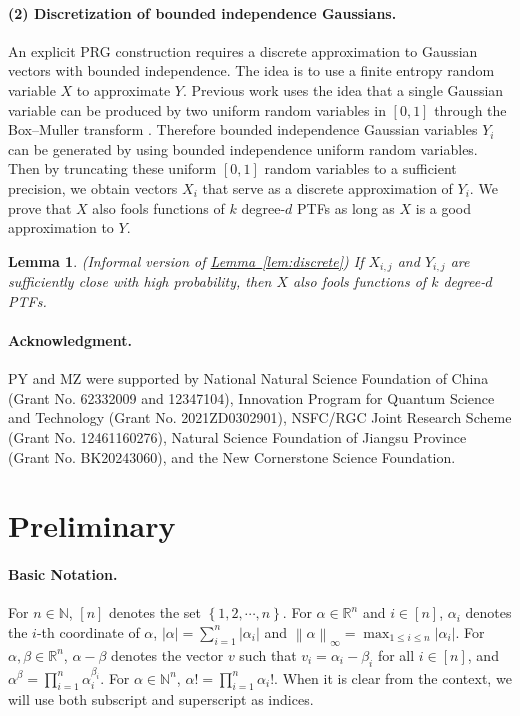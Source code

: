 \documentclass[12pt]{article}
\newtheorem{lemma}[theorem]{Lemma}
\newcommand{\lem}[1]{\hyperref[lem:#1]{Lemma~\ref*{lem:#1}}}
\newcommand{\N}{\mathbb{N}}  \newcommand{\R}{\mathbb{R}} \newcommand{\C}{\mathbb{C}} \newcommand{\U}{\mathbb{U}} \renewcommand{\d}{\mathrm{d}} \DeclareMathOperator*{\E}{\mathbb{E}}  \newcommand{\so}{\mathrm{SO}} \newcommand{\s}{\mathrm{S}} \newcommand{\su}{\mathrm{SU}} \renewcommand{\i}{\mathrm{i}} \newcommand{\A}{\mathcal{A}}  \newcommand{\B}{\mathcal{B}} \newcommand{\CC}{\mathcal{C}} \newcommand{\D}{\mathcal{D}} \newcommand{\F}{\mathcal{F}} \renewcommand{\H}{\mathcal{H}} \newcommand{\K}{\mathcal{K}} \newcommand{\NN}{\mathcal{N}} \newcommand{\V}{\mathcal{V}} \newcommand{\X}{\mathcal{X}} \newcommand{\Y}{\mathcal{Y}} \renewcommand{\S}{\mathcal{S}} \newcommand{\SR}{\mathcal{S}_{\R}} \newcommand{\SC}{\mathcal{S}_{\C}} \newcommand{\EE}{\mathcal{E}}  \newcommand{\PP}{\mathcal{P}} \newcommand{\KK}{\widetilde{K}} \newcommand{\LL}{\widetilde{L}} \newcommand{\W}{\widehat{W}} \newcommand{\f}{\hat{f}} \newcommand{\g}{\hat{g}} \newcommand{\h}{\hat{h}} \newcommand{\bit}[1]{\{0,1\}^{#1}} \newcommand{\wrt}{w.r.t.~} \newcommand{\us}{\overset{\$}{\leftarrow}} \newcommand{\set}[1]{\left\{#1\right\}} \newcommand{\lhs}{\mathrm{LHS}} \newcommand{\expec}[1]{\E\!\Br{#1}} \newcommand{\expect}[2]{\E_{\substack{#1}}\!\Br{#2}} \newcommand{\prob}[2]{\underset{#1}{\mathrm{Pr}}\!\Br{#2}} \newcommand{\cf}{\widetilde{f}} \newcommand{\cg}{\widetilde{g}} \newcommand{\ch}{\widetilde{h}} \newcommand{\ck}{\widetilde{K}} \newcommand{\rep}[2]{\br{#1}_{#2}} \newcommand{\AND}[1]{\mathrm{AND}\!\br{#1}}
\newcommand{\br}[1]{\left(#1\right)} \newcommand{\Br}[1]{\left[#1\right]} \newcommand{\st}[1]{\left\{#1\right\}} \newcommand{\tr}[1]{\mathrm{Tr}\!\Br{#1}} \newcommand{\abs}[1]{\left|#1 \right|} \newcommand{\norm}[1]{\left\lVert #1 \right\rVert} \newcommand{\agl}[2]{\theta^{\br{#1}}_{#2}} \newcommand{\aglp}[2]{{\theta'}^{\br{#1}}_{#2}} \newcommand{\lint}[1]{\left\lfloor#1\right\rfloor} \newcommand{\poly}[1]{\mathrm{poly}\!\br{#1}} \newcommand{\negl}[1]{\mathrm{negl}\!\br{#1}} \newcommand{\de}[1]{\mathrm{d}#1} \newcommand{\val}[1]{\mathrm{val}\!\br{#1}} \newcommand{\vall}[1]{\mathrm{val}\br{#1}} \newcommand{\nd}[1]{\mathcal{N}\!\br{#1}} \newcommand{\ketbratwo}[2]{\ket{#1} \hspace{-0.4em}\bra{#2}} \newcommand{\ketbra}[1]{\ketbratwo{#1}{#1}} \newcommand{\id}{\ensuremath{\mathds{1}}} \newcommand{\ogroup}[1]{\mathrm{O}\!\br{#1}} \newcommand{\ugroup}[1]{\mathrm{U}\!\br{#1}} \newcommand{\td}{\mathrm{TD}} \newcommand{\tv}[1]{\norm{#1}_{\mathrm{TV}}} \newcommand {\defeq} {\ensuremath{ \stackrel{\mathrm{def}}{=} }} \newcommand{\vdim}{\ensuremath{N}} \newcommand{\dimin}{\ensuremath{n}} \newcommand{\dimout}{\ensuremath{m}} \newcommand{\ncopy}{\ell} \newcommand{\hspacein}{\H_\mathrm{in}} \newcommand{\hspaceout}{\H_\mathrm{out}} \newcommand{\Sin}{\S(\hspacein)} \newcommand{\Sout}{\S(\hspaceout)} \newcommand{\haar}{\ensuremath{\mu}} \newcommand{\tensorhaar}{\ensuremath{\eta}} \newcommand{\tensorsrss}{\ensuremath{\nu}} \newcommand{\qadvice}{\ensuremath{\rho}} \newcommand{\tp}{\otimes} \newcommand{\wone}[2]{W_1\!\br{#1,#2}}
\begin{document}
\paragraph{(2) Discretization of bounded independence Gaussians.}
An explicit PRG construction requires a discrete approximation to Gaussian vectors with bounded independence.
The idea is to use a finite entropy random variable $X$ to approximate $Y$.
Previous work \cite{Kan11b} uses the idea that a single Gaussian variable can be produced by two uniform random variables in $[0,1]$ through the Box–Muller transform \cite{Bm58}.
Therefore bounded independence Gaussian variables $Y_i$ can be generated by using bounded independence uniform random variables.
Then by truncating these uniform $[0,1]$ random variables to a sufficient precision, we obtain vectors $X_i$ that serve as a discrete approximation of $Y_i$.
We prove that $X$ also fools functions of $k$ degree-$d$ PTFs as long as $X$ is a good approximation to $Y$.
\begin{lemma}(Informal version of \lem{discrete})
	If $X_{i,j}$ and $Y_{i,j}$ are sufficiently close with high probability, then $X$ also fools functions of $k$ degree-$d$ PTFs.
\end{lemma}
















 

\paragraph{Acknowledgment.} PY and MZ were supported by
National Natural Science Foundation of China (Grant No. 62332009 and 12347104),
Innovation Program for Quantum Science and Technology (Grant No. 2021ZD0302901),
NSFC/RGC Joint Research Scheme (Grant No. 12461160276),
Natural Science Foundation of Jiangsu Province (Grant No. BK20243060),
and the New Cornerstone Science Foundation.

\section{Preliminary}
\label{sec:prelim}
\paragraph{Basic Notation.}
For $n\in \N$, $[n]$ denotes the set $\st{1,2,\cdots,n}$.
For $\alpha\in \R^n$ and $i\in[n]$, $\alpha_i$ denotes the $i$-th coordinate of $\alpha$, $\abs{\alpha} = \sum_{i=1}^n \abs{\alpha_i}$ and $\norm{\alpha}_{\infty} = \max_{1\leq i\leq n} \abs{\alpha_i}$.
For $\alpha, \beta\in \R^n$, $\alpha-\beta$ denotes the vector $v$ such that $v_i = \alpha_i-\beta_i$ for all $i\in[n]$, and $\alpha^{\beta} = \prod_{i=1}^n \alpha_i^{\beta_i}$.
For $\alpha\in \N^n$, $\alpha! = \prod_{i=1}^n \alpha_i!$.
When it is clear from the context, we will use both subscript and superscript as indices.
\vspace{-1em}
\end{document}
